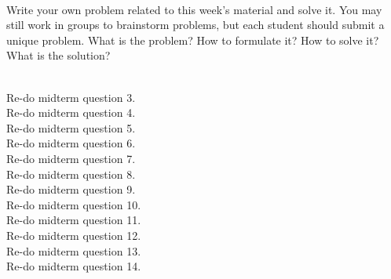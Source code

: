\documentclass[]{article}
\begin{document}
\begin{qunlist}
{{\begin{itemize}
\end{itemize}
}}
\fi

 \\
Write your own problem related to this week's material and solve it. You may still work in groups to brainstorm problems, but each student should submit a unique problem. What is the problem? How to formulate it? How to solve it? What is the solution?

 \\
Re-do midterm question 3.
 \\
Re-do midterm question 4.
 \\
Re-do midterm question 5.
 \\
Re-do midterm question 6.
 \\
Re-do midterm question 7.
 \\
Re-do midterm question 8.
 \\
Re-do midterm question 9.
 \\
Re-do midterm question 10.
 \\
Re-do midterm question 11.
 \\
Re-do midterm question 12.
 \\
Re-do midterm question 13.
 \\
Re-do midterm question 14.

\end{qunlist}
\end{document}
